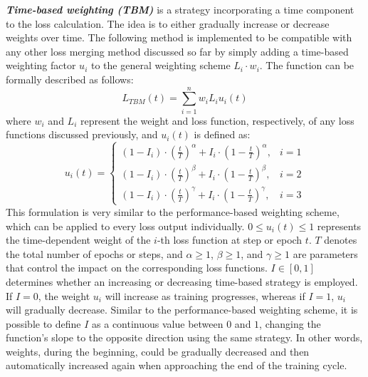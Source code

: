\textbf{\emph{Time-based weighting (TBM)}} is a strategy incorporating a time component to the loss calculation. The idea is to either gradually increase or decrease weights over time. The following method is implemented to be compatible with any other loss merging method discussed so far by simply adding a time-based weighting factor $u_i$ to the general weighting scheme $L_i \cdot w_i$. The function can be formally described as follows:
\begin{equation}
  L_{TBM}(t) = \sum_{i=1}^{n} w_i L_i u_i(t)
\end{equation}
where $w_i$ and $L_i$ represent the weight and loss function, respectively, of any loss functions discussed previously, and $u_i(t)$ is defined as:
\begin{equation}
  u_i(t)=
  \begin{cases}
    (1-I_i)\cdot \left(\frac{t}{T}\right)^{\alpha} + I_i \cdot\left(1-\frac{t}{T}\right)^{\alpha}, & i=1 \\
    (1-I_i)\cdot \left(\frac{t}{T}\right)^{\beta} + I_i \cdot\left(1-\frac{t}{T}\right)^{\beta},   & i=2 \\
    (1-I_i)\cdot \left(\frac{t}{T}\right)^{\gamma} + I_i \cdot\left(1-\frac{t}{T}\right)^{\gamma}, & i=3
  \end{cases}
\end{equation}
This formulation is very similar to the performance-based weighting scheme, which can be applied to every loss output individually. $0 \leq u_i(t) \leq 1$ represents the time-dependent weight of the $i$-th loss function at step or epoch $t$. $T$ denotes the total number of epochs or steps, and $\alpha \geq 1$, $\beta \geq 1$, and $\gamma \geq 1$ are parameters that control the impact on the corresponding loss functions. $I \in [0,1]$ determines whether an increasing or decreasing time-based strategy is employed. If $I=0$, the weight $u_i$ will increase as training progresses, whereas if $I=1$, $u_i$ will gradually decrease. Similar to the performance-based weighting scheme, it is possible to define $I$ as a continuous value between $0$ and $1$, changing the function's slope to the opposite direction using the same strategy. In other words, weights, during the beginning, could be gradually decreased and then automatically increased again when approaching the end of the training cycle.


